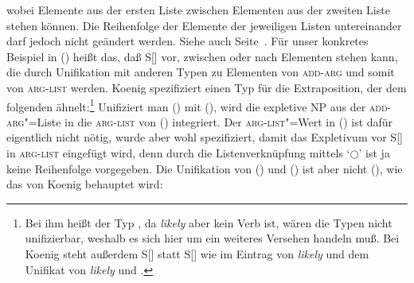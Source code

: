 wobei Elemente aus der ersten Liste zwischen Elementen aus der zweiten Liste stehen können.
Die Reihenfolge der Elemente der jeweiligen Listen untereinander darf jedoch nicht geändert
werden. Siehe auch Seite~\pageref{rel-shuffle}. Für unser konkretes Beispiel in
() heißt das, daß S[] vor, zwischen oder nach Elementen stehen kann,
die durch Unifikation mit anderen Typen zu Elementen von \textsc{add-arg} und somit
von \textsc{arg-list} werden. Koenig spezifiziert einen Typ für die Extraposition,
der dem folgenden ähnelt:\footnote{
  Bei ihm heißt der Typ , da \emph{likely} aber kein Verb ist,
  wären die Typen nicht unifizierbar, weshalb es sich hier um ein weiteres
  Versehen handeln muß. Bei Koenig steht außerdem S[] statt S[]
  wie im Eintrag von \emph{likely} und dem Unifikat von \emph{likely} und .%
}
\ea
\label{linking-extraposition}
\z
Unifiziert man () mit (), wird die expletive NP aus der \textsc{add-arg}"=Liste
in die \textsc{arg-list} von () integriert. Der \textsc{arg-list}"=Wert in ()
ist dafür eigentlich nicht nötig, wurde aber wohl spezifiziert, damit das Expletivum
vor S[] in \textsc{arg-list} eingefügt wird, denn durch die Listenverknüpfung
mittels `$\bigcirc$' ist ja keine Reihenfolge vorgegeben.
Die Unifikation von () und () ist aber nicht (), wie das von Koenig
behauptet wird:
\ea
{}
